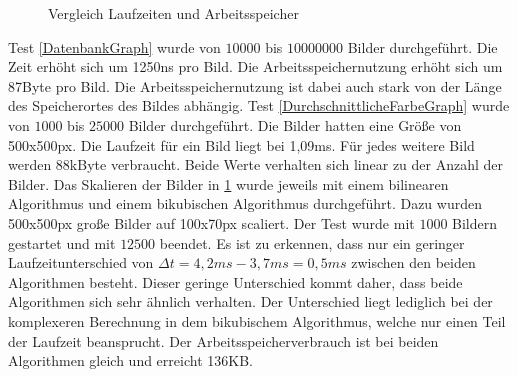 \begin{figure}
{
        \label{SkalierenGraph}
    }
    
    \caption[Laufzeit]{Vergleich Laufzeiten und Arbeitsspeicher}
\end{figure}
Test \ref{DatenbankGraph} wurde von $10000$ bis $10000000$ Bilder durchgeführt. Die Zeit erhöht sich um 1250ns pro Bild. Die Arbeitsspeichernutzung erhöht sich um 87Byte pro Bild. Die Arbeitsspeichernutzung ist dabei auch stark von der Länge des Speicherortes des Bildes abhängig.
\newline
Test \ref{DurchschnittlicheFarbeGraph} wurde von $1000$ bis $25000$ Bilder durchgeführt. Die Bilder hatten eine Größe von 500x500px. Die Laufzeit für ein Bild liegt bei 1,09ms. Für jedes weitere Bild werden 88kByte verbraucht. Beide Werte verhalten sich linear zu der Anzahl der Bilder.
\newline
Das Skalieren der Bilder in \ref{SkalierenGraph} wurde jeweils mit einem bilinearen Algorithmus und einem bikubischen Algorithmus durchgeführt. Dazu wurden 500x500px große Bilder auf 100x70px scaliert. Der Test wurde mit $1000$ Bildern gestartet und mit $12500$ beendet. Es ist zu erkennen, dass nur ein geringer Laufzeitunterschied von $\Delta t = 4,2ms - 3,7ms = 0,5ms$ zwischen den beiden Algorithmen besteht. Dieser geringe Unterschied kommt daher, dass beide Algorithmen sich sehr ähnlich verhalten. Der Unterschied liegt lediglich bei der komplexeren Berechnung in dem bikubischem Algorithmus, welche nur einen Teil der Laufzeit beansprucht. Der Arbeitsspeicherverbrauch ist bei beiden Algorithmen gleich und erreicht 136KB.
